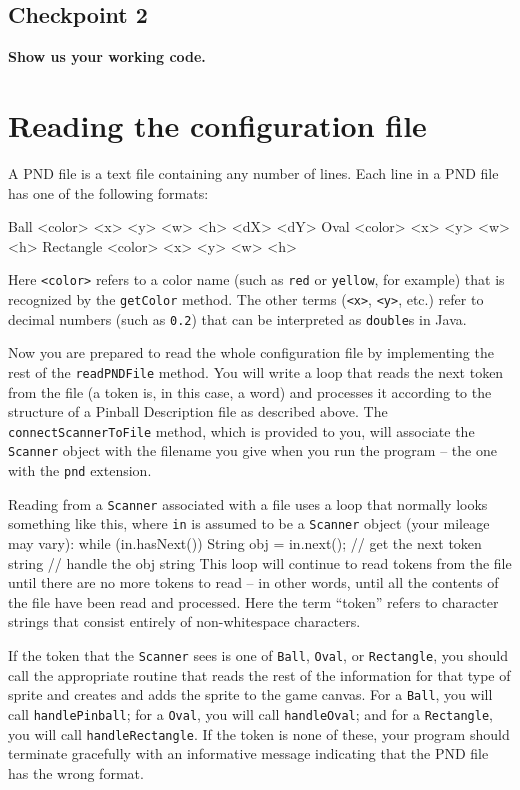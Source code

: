 \documentclass[12pt]{article}
\newenvironment{qv}%
  {\quote
   \verbatim}%
  {\endverbatim
   \endquote}
\begin{document}
\subsection*{Checkpoint 2}
{\bf
Show us your working code.
}

\section*{Reading the configuration file}

A PND file is a text file containing
any number of lines.
Each line in a PND file has one of the following formats:

\begin{qv}
Ball <color> <x> <y> <w> <h> <dX> <dY>
Oval <color> <x> <y> <w> <h>
Rectangle <color> <x> <y> <w> <h>
\end{qv}

Here \verb'<color>' refers to a color name
(such as \verb'red' or \verb'yellow', for example)
that is recognized by the \verb'getColor' method.
The other terms (\verb'<x>', \verb'<y>', etc.)
refer to decimal numbers (such as \verb'0.2')
that can be interpreted as \verb'double's in Java.

Now you are prepared to read the whole configuration file
by implementing the rest of the \verb'readPNDFile' method.
You will write a loop that
reads the next token from the file
(a token is, in this case, a word)
and processes it according to the structure
of a Pinball Description file as described above.
The \verb'connectScannerToFile' method,
which is provided to you,
will associate the \verb'Scanner' object
with the filename you give when you run the program --
the one with the \verb'pnd' extension.

Reading from a \verb'Scanner' associated with a file
uses a loop that normally looks something like this,
where \verb'in' is assumed to be a \verb'Scanner' object
(your mileage may vary):
\begin{qv}
while (in.hasNext()) {
    String obj = in.next(); // get the next token string
    // handle the obj string
}
\end{qv}
This loop will continue to read tokens from the file
until there are no more tokens to read --
in other words, until all the contents
of the file have been read and processed.
Here the term ``token'' refers
to character strings that consist entirely
of non-whitespace characters.

If the token that the \verb'Scanner' sees
is one of \verb'Ball', \verb'Oval', or \verb'Rectangle',
you should call the appropriate routine
that reads the rest of the information for that
type of sprite and creates and adds the sprite to the game canvas.
For a \verb'Ball', you will call \verb'handlePinball';
for a \verb'Oval', you will call \verb'handleOval'; and
for a \verb'Rectangle', you will call \verb'handleRectangle'.
If the token is none of these,
your program should terminate gracefully
with an informative message indicating
that the PND file has the wrong format.
\end{document}

